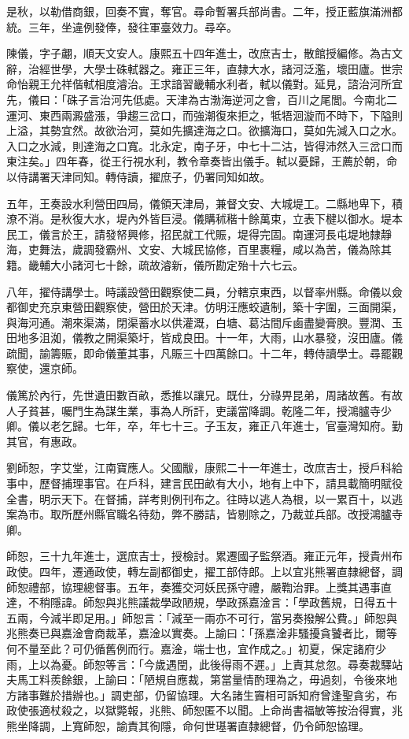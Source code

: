 \begin{pinyinscope}
是秋，以勒借商銀，回奏不實，奪官。尋命暫署兵部尚書。二年，授正藍旗滿洲都統。三年，坐違例發俸，發往軍臺效力。尋卒。

陳儀，字子翽，順天文安人。康熙五十四年進士，改庶吉士，散館授編修。為古文辭，治經世學，大學士硃軾器之。雍正三年，直隸大水，諸河泛濫，壞田廬。世宗命怡親王允祥偕軾相度濬治。王求諳習畿輔水利者，軾以儀對。延見，諮治河所宜先，儀曰：「硃子言治河先低處。天津為古渤海逆河之會，百川之尾閭。今南北二運河、東西兩澱盛漲，爭趨三岔口，而強潮復來拒之，牴牾洄漩而不時下，下隘則上溢，其勢宜然。故欲治河，莫如先擴達海之口。欲擴海口，莫如先減入口之水。入口之水減，則達海之口寬。北永定，南子牙，中七十二沽，皆得沛然入三岔口而東注矣。」四年春，從王行視水利，教令章奏皆出儀手。軾以憂歸，王薦於朝，命以侍講署天津同知。轉侍讀，擢庶子，仍署同知如故。

五年，王奏設水利營田四局，儀領天津局，兼督文安、大城堤工。二縣地卑下，積潦不消。是秋復大水，堤內外皆巨浸。儀購秫稭十餘萬束，立表下楗以御水。堤本民工，儀言於王，請發帑興修，招民就工代賑，堤得完固。南運河長屯堤地隸靜海，吏舞法，歲調發霸州、文安、大城民協修，百里裹糧，咸以為苦，儀為除其籍。畿輔大小諸河七十餘，疏故濬新，儀所勘定殆十六七云。

八年，擢侍講學士。時議設營田觀察使二員，分轄京東西，以督率州縣。命儀以僉都御史充京東營田觀察使，營田於天津。仿明汪應蛟遺制，築十字圍，三面開渠，與海河通。潮來渠滿，閉渠蓄水以供灌溉，白塘、葛沽間斥鹵盡變膏腴。豐潤、玉田地多沮洳，儀教之開渠築圩，皆成良田。十一年，大雨，山水暴發，沒田廬。儀疏聞，諭籌賑，即命儀董其事，凡賑三十四萬餘口。十二年，轉侍讀學士。尋罷觀察使，還京師。

儀篤於內行，先世遺田數百畝，悉推以讓兄。既仕，分祿畀昆弟，周諸故舊。有故人子貧甚，囑門生為謀生業，事為人所訐，吏議當降調。乾隆二年，授鴻臚寺少卿。儀以老乞歸。七年，卒，年七十三。子玉友，雍正八年進士，官臺灣知府。勤其官，有惠政。

劉師恕，字艾堂，江南寶應人。父國黻，康熙二十一年進士，改庶吉士，授戶科給事中，歷督捕理事官。在戶科，建言民田畝有大小，地有上中下，請具載簡明賦役全書，明示天下。在督捕，詳考則例刊布之。往時以逃人為根，以一累百十，以逃案為市。取所歷州縣官職名待劾，弊不勝詰，皆剔除之，乃裁並兵部。改授鴻臚寺卿。

師恕，三十九年進士，選庶吉士，授檢討。累遷國子監祭酒。雍正元年，授貴州布政使。四年，遷通政使，轉左副都御史，擢工部侍郎。上以宜兆熊署直隸總督，調師恕禮部，協理總督事。五年，奏獲交河妖民孫守禮，嚴鞫治罪。上獎其遇事直達，不稍隱諱。師恕與兆熊議裁學政陋規，學政孫嘉淦言：「學政舊規，日得五十五兩，今減半即足用。」師恕言：「減至一兩亦不可行，當另奏撥解公費。」師恕與兆熊奏已與嘉淦會商裁革，嘉淦以實奏。上諭曰：「孫嘉淦非騷擾貪饕者比，爾等何不量至此？可仍循舊例而行。嘉淦，端士也，宜作成之。」初夏，保定諸府少雨，上以為憂。師恕等言：「今歲遇閏，此後得雨不遲。」上責其怠忽。尋奏裁驛站夫馬工料羨餘銀，上諭曰：「陋規自應裁，第當量情酌理為之，毋過刻，令後來地方諸事難於措辦也。」調吏部，仍留協理。大名諸生竇相可訴知府曾逢聖貪劣，布政使張適杖殺之，以獄斃報，兆熊、師恕匿不以聞。上命尚書福敏等按治得實，兆熊坐降調，上寬師恕，諭責其徇隱，命何世璂署直隸總督，仍令師恕協理。


\end{pinyinscope}
